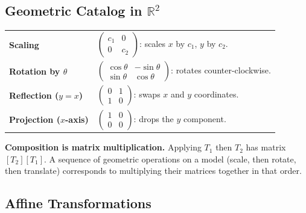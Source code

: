 \subsection*{\texorpdfstring{Geometric Catalog in $\mathbb{R}^2$}{Geometric Catalog in R2}}

\begin{tcolorbox}[colback=gray!6, colframe=gray!40, arc=2pt,
  left=6pt, right=6pt, top=4pt, bottom=4pt,
  title={\small\textbf{Standard Planar Transformations}},
  fonttitle=\small\bfseries]
\begin{tabular}{@{}p{}p{}@{}}
\textbf{Scaling}           & $\begin{pmatrix} c_1 & 0 \\ 0 & c_2 \end{pmatrix}$: scales $x$ by $c_1$, $y$ by $c_2$. \\[8pt]
\textbf{Rotation by $\theta$} & $\begin{pmatrix} \cos\theta & -\sin\theta \\ \sin\theta & \cos\theta \end{pmatrix}$: rotates counter-clockwise. \\[8pt]
\textbf{Reflection ($y=x$)} & $\begin{pmatrix} 0 & 1 \\ 1 & 0 \end{pmatrix}$: swaps $x$ and $y$ coordinates. \\[8pt]
\textbf{Projection ($x$-axis)} & $\begin{pmatrix} 1 & 0 \\ 0 & 0 \end{pmatrix}$: drops the $y$ component. \\
\end{tabular}
\end{tcolorbox}

\begin{remark*}[Exposition]
\textbf{Composition is matrix multiplication.}
Applying $T_1$ then $T_2$ has matrix $[T_2][T_1]$.
A sequence of geometric operations on a model (scale, then rotate, then translate)
corresponds to multiplying their matrices together in that order.
\end{remark*}

\subsection*{Affine Transformations}

